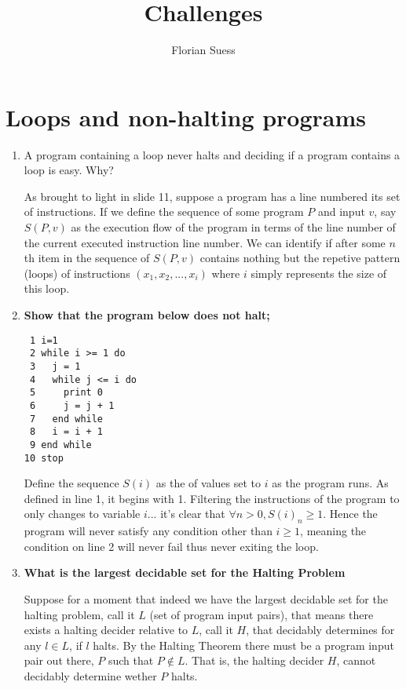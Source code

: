 \documentclass{article}
\title {Challenges}
\author {Florian Suess}
\newenvironment{answered}{\par\normalfont}{}
\begin{document}
\maketitle
\section{Loops and non-halting programs}

\begin{enumerate}
	\item A program containing a loop never halts and deciding if a program contains a loop is easy. Why?
	\begin{answered}
		As brought to light in slide 11, suppose a program has a line numbered its set of instructions. If we define the sequence of some program $P$ and input $v$, say $S(P, v)$ as the execution flow of the program in terms of the line number of the current executed instruction line number. We can identify if after some $n$th item in the sequence of $S(P,v)$ contains nothing but the repetive pattern (loops) of instructions $(x_1, x_2, ..., x_i)$ where $i$ simply represents the size of this loop.
	\end{answered}
\item \textbf{Show that the program below does not halt;}
\begin{verbatim}
 1 i=1
 2 while i >= 1 do 
 3   j = 1
 4   while j <= i do
 5     print 0
 6     j = j + 1
 7   end while	
 8   i = i + 1
 9 end while
10 stop
\end{verbatim}
 \begin{answered}
	 Define the sequence $S(i)$ as the of values set to $i$ as the program runs. As defined in line 1, it begins with 1. Filtering the instructions of the program to only changes to variable $i$... it's clear that $\forall n > 0, S(i)_n \geq 1$. Hence the program will never satisfy any condition other than $i \geq 1$, meaning the condition on line 2 will never fail thus never exiting the loop.
 \end{answered}

\pagebreak
\item \textbf{What is the largest decidable set for the Halting Problem}
	\begin{answered}
	Suppose for a moment that indeed we have the largest decidable set for the halting problem, call it $L$ (set of program input pairs), that means there exists a halting decider relative to $L$, call it $H$, that decidably determines for any $l \in L$, if $l$ halts. By the Halting Theorem there must be a program input pair out there, $P$ such that $P \not\in L$. That is, the halting decider $H$, cannot decidably determine wether $P$ halts.


\end{answered}
\end{enumerate}
\end{document}

